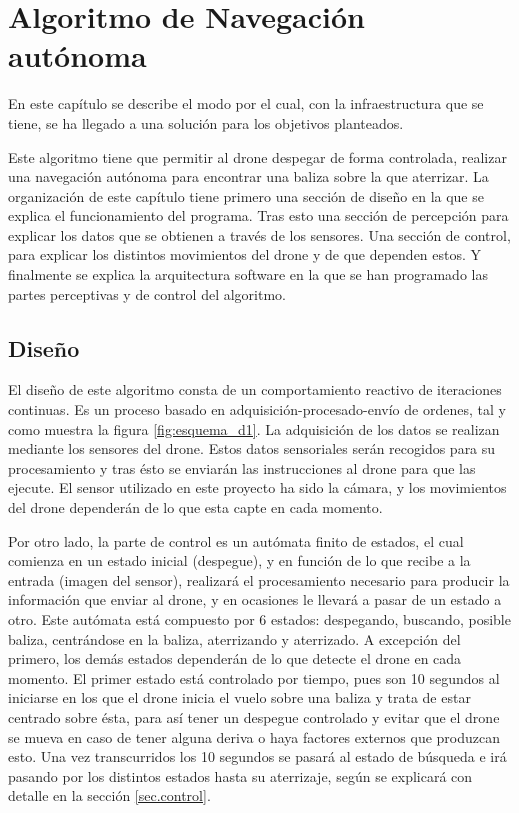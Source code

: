 \chapter{Algoritmo de Navegaci\'on aut\'onoma}\label{cap.algoritmo} %

\hspace{1 cm} En este cap\'itulo se describe el modo por el cual, con la infraestructura que se tiene, se ha llegado a una soluci\'on para los objetivos planteados. 

\hspace{1 cm} Este algoritmo tiene que permitir al drone despegar de forma controlada, realizar una navegaci\'on aut\'onoma para encontrar una baliza sobre la que aterrizar. La organizaci\'on de este cap\'itulo tiene primero una secci\'on de diseño en la que se explica el funcionamiento del programa. Tras esto una secci\'on de percepci\'on para explicar los datos que se obtienen a trav\'es de los sensores. Una secci\'on de control, para explicar los distintos movimientos del drone y de que dependen estos. Y finalmente se explica la arquitectura software en la que se han programado las partes perceptivas y de control del algoritmo.

\section{Diseño}
\label{sec.Design}

\hspace{1 cm} El diseño de este algoritmo consta de un comportamiento reactivo de iteraciones continuas. Es un proceso basado en adquisici\'on-procesado-env\'io de ordenes, tal y como muestra la figura \ref{fig:esquema_d1}. La adquisici\'on de los datos se realizan mediante los sensores del drone. Estos datos sensoriales ser\'an recogidos para su procesamiento y tras \'esto se enviar\'an las instrucciones al drone para que las ejecute. El sensor utilizado en este proyecto ha sido la c\'amara, y los movimientos del drone depender\'an de lo que esta capte en cada momento. 

\hspace{1 cm} Por otro lado, la parte de control es un aut\'omata finito de estados, el cual comienza en un estado inicial (despegue), y en funci\'on de lo que recibe a la entrada (imagen del sensor), realizar\'a el procesamiento necesario para producir la informaci\'on que enviar al drone, y en ocasiones le llevar\'a a pasar de un estado a otro. Este aut\'omata est\'a compuesto por 6 estados: despegando, buscando, posible baliza, centr\'andose en la baliza, aterrizando y aterrizado. A excepci\'on del primero, los dem\'as estados depender\'an de lo que detecte el drone en cada momento. El primer estado est\'a controlado por tiempo, pues son 10 segundos al iniciarse en los que el drone inicia el vuelo sobre una baliza y trata de estar centrado sobre \'esta, para as\'i tener un despegue controlado y evitar que el drone se mueva en caso de tener alguna deriva o haya factores externos que produzcan esto. Una vez transcurridos los 10 segundos se pasar\'a al estado de b\'usqueda e ir\'a pasando por los distintos estados hasta su aterrizaje, seg\'un se explicar\'a con detalle en la secci\'on \ref{sec.control}. 

